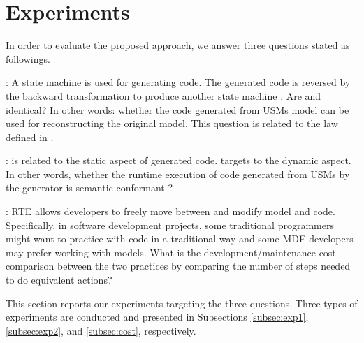 \section{Experiments}
\label{sec:experiments}
In order to evaluate the proposed approach, we answer three questions stated as followings. 

: A state machine  is used for generating code. The generated code is reversed by the backward transformation to produce another state machine . Are  and  identical? In other words: whether the code generated from USMs model can be used for reconstructing the original model. This question is related to the  law defined in \cite{foster_combinators_2007}.

:  is related to the static aspect of generated code.  targets to the dynamic aspect. In other words, whether the runtime execution of code generated from USMs by the generator is semantic-conformant \cite{OMG2015}?

: RTE allows developers to freely move between and modify model and code. Specifically, in software development projects, some traditional programmers might want to practice with code in a traditional way and some MDE developers may prefer working with models. What is the development/maintenance cost comparison between the two practices by comparing the number of steps needed to do equivalent actions?

This section reports our experiments targeting the three questions. Three types of experiments are conducted and presented in Subsections \ref{subsec:exp1}, \ref{subsec:exp2}, and \ref{subsec:cost}, respectively. 

